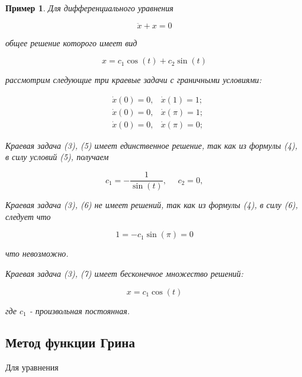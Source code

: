 \documentclass{article}
\theoremstyle{plain} \newtheorem*{theorem*}{Теорема}
\theoremstyle{plain} \newtheorem{theorem}{Теорема}[section]
\theoremstyle{defintition} \newtheorem*{corollary*}{Следствие}
\theoremstyle{plain} \newtheorem*{example*}{Пример}
\theoremstyle{plain} \newtheorem*{remark*}{Замечание}
\begin{document}
\begin{example*}
    Для дифференциального уравнения

    \begin{equation}
        \ddot{x} + x = 0
    \end{equation}

    общее решение которого имеет вид

    \begin{equation}
        x = c_1 \cos(t) + c_2 \sin(t)
    \end{equation}

    рассмотрим следующие три краевые задачи
    с граничными условиями:

    \begin{align}
        &\dot{x}(0) = 0, &\dot{x}(1) = 1; \\
        &\dot{x}(0) = 0, &\dot{x}(\pi) = 1; \\
        &\dot{x}(0) = 0, &\dot{x}(\pi) = 0;
    \end{align}

    Краевая задача (3), (5) имеет единственное решение,
    так как из формулы (4), в силу условий (5), получаем

    \begin{equation*}
        c_1 = - \frac{1}{\sin(t)}, \ \ \ \ \ \
        c_2 = 0,
    \end{equation*}

    Краевая задача (3), (6) не имеет решений,
    так как из формулы (4), в силу (6), следует что

    \begin{equation*}
        1 = -c_1 \sin(\pi) = 0
    \end{equation*}

    что невозможно.

    Краевая задача (3), (7) имеет бесконечное множество решений:

    \begin{equation*}
        x = c_1 \cos(t)
    \end{equation*}

    где $c_1$ - произвольная постоянная.

\end{example*}

\subsection*{Метод функции Грина}

Для уравнения
\end{document}
